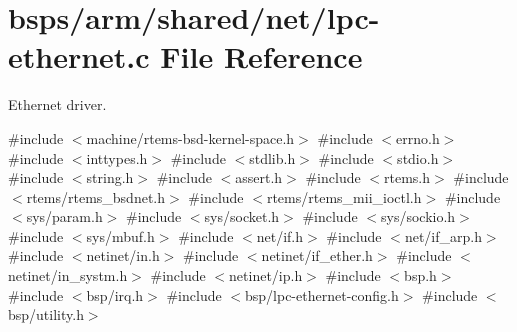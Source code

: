 \hypertarget{lpc-ethernet_8c}{}\section{bsps/arm/shared/net/lpc-\/ethernet.c File Reference}
\label{lpc-ethernet_8c}


Ethernet driver.  


{\ttfamily \#include $<$machine/rtems-\/bsd-\/kernel-\/space.\+h$>$}\newline
{\ttfamily \#include $<$errno.\+h$>$}\newline
{\ttfamily \#include $<$inttypes.\+h$>$}\newline
{\ttfamily \#include $<$stdlib.\+h$>$}\newline
{\ttfamily \#include $<$stdio.\+h$>$}\newline
{\ttfamily \#include $<$string.\+h$>$}\newline
{\ttfamily \#include $<$assert.\+h$>$}\newline
{\ttfamily \#include $<$rtems.\+h$>$}\newline
{\ttfamily \#include $<$rtems/rtems\+\_\+bsdnet.\+h$>$}\newline
{\ttfamily \#include $<$rtems/rtems\+\_\+mii\+\_\+ioctl.\+h$>$}\newline
{\ttfamily \#include $<$sys/param.\+h$>$}\newline
{\ttfamily \#include $<$sys/socket.\+h$>$}\newline
{\ttfamily \#include $<$sys/sockio.\+h$>$}\newline
{\ttfamily \#include $<$sys/mbuf.\+h$>$}\newline
{\ttfamily \#include $<$net/if.\+h$>$}\newline
{\ttfamily \#include $<$net/if\+\_\+arp.\+h$>$}\newline
{\ttfamily \#include $<$netinet/in.\+h$>$}\newline
{\ttfamily \#include $<$netinet/if\+\_\+ether.\+h$>$}\newline
{\ttfamily \#include $<$netinet/in\+\_\+systm.\+h$>$}\newline
{\ttfamily \#include $<$netinet/ip.\+h$>$}\newline
{\ttfamily \#include $<$bsp.\+h$>$}\newline
{\ttfamily \#include $<$bsp/irq.\+h$>$}\newline
{\ttfamily \#include $<$bsp/lpc-\/ethernet-\/config.\+h$>$}\newline
{\ttfamily \#include $<$bsp/utility.\+h$>$}\newline

